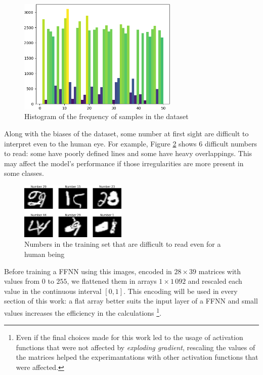 \documentclass[compsoc]{IEEEtran}
\begin{document}
\begin{figure}[ht!]
\centering                                                                        
\includegraphics[width=3in]{datahist.png}
\captionsetup{justification=centering}                                                                                                                                   
\caption{Histogram of the frequency of samples in the dataset}
\label{fig:datahist}
\end{figure}


Along with the biases of the dataset, some number at first sight are difficult to interpret even to the human eye. For example,
Figure \ref{fig:unread} shows 6 difficult numbers to read: some have poorly defined lines and some have heavy overlappings. This may affect the
model's performance if those irregularities are more present in some classes.\par



\begin{figure}[ht!]
\centering                                                                        
\includegraphics[width=2in]{unread.png}
\captionsetup{justification=centering}                                                                                                                                   
\caption{Numbers in the training set that are difficult to read even for a human being}
\label{fig:unread}
\end{figure}


Before training a FFNN using this images, encoded in $28\times39$ matrices with values from $0$ to $255$, we flattened them in
arrays $1\times1\,092$ and rescaled each value in the continuous interval $[0, 1]$. This encoding will be used in every section of this work: a flat array
better suits the input layer of a FFNN and small values increases the efficiency in the calculations
\footnote{Even if the final choices made for this work led to the usage of activation functions that were not affected by \emph{exploding gradient}, rescaling the values of the matrices helped the experimantations with other activation functions that were affected.}.
\end{document}

